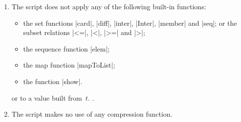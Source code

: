 \begin{definition}
\begin{enumerate}
\item\label{item:built-in-functions} The script does not apply any of the
  following built-in functions:
  \begin{itemize}
    \item the set functions |card|, |diff|, |inter|, |Inter|, |member| and
      |seq|; or the subset relations |<=|, |<|, |>=| and |>|;

    \item the sequence function |elem|;

    \item the map function |mapToList|;

    \item the function |show|.
  \end{itemize}
   or  to a value built from~$t$.
  . 

\item The script makes no use of any compression function.
\end{enumerate}
\end{definition}
